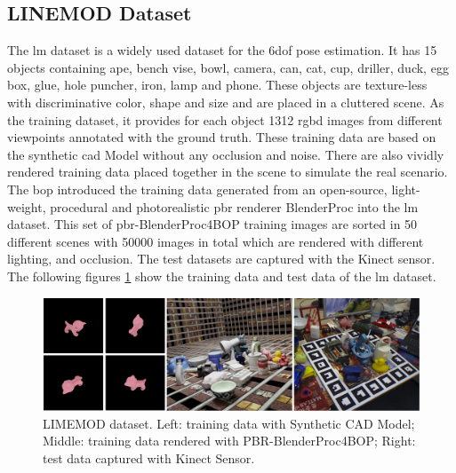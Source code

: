 \documentclass[12pt,DIV14,BCOR12mm,a4paper,footinclude=false,headinclude,parskip=half-,twoside,openright,cleardoublepage=empty,toc=index,bibliography=totoc,listof=totoc]{scrreprt}
\numberwithin{equation}{chapter}
\begin{document}
\subsection{LINEMOD Dataset}
The \gls{lm} dataset \cite{hinterstoisser2012model} is a widely used dataset for the \gls{6dof} pose estimation. It has 15 objects containing ape, bench vise, bowl, camera, can, cat, cup, driller, duck, egg box, glue, hole puncher, iron, lamp and phone. These objects are texture-less with discriminative color, shape and size and are placed in a cluttered scene. As the training dataset, it provides for each object 1312 \gls{rgbd} images from different viewpoints annotated with the ground truth. These training data are based on the synthetic \gls{cad} Model without any occlusion and noise. There are also vividly rendered training data placed together in the scene to simulate the real scenario. The \gls{bop} \cite{hodan2018bop} introduced the training data generated from an open-source, light-weight, procedural and photorealistic \gls{pbr} renderer BlenderProc \cite{denninger2019blenderproc} into the \gls{lm} dataset.
This set of \gls{pbr}-BlenderProc4BOP training images are sorted in 50 different scenes with 50000 images in total which are rendered with different lighting, and occlusion. The test datasets are captured with the Kinect sensor. The following figures \ref{img:linemod} show the training data and test data of the \gls{lm} dataset.
\begin{figure}[h]
  \centering
  \includegraphics[width=1.0\textwidth]{img/lm.pdf}
  \caption{LIMEMOD dataset. Left: training data with Synthetic CAD Model; Middle: training data rendered with PBR-BlenderProc4BOP; Right: test data captured with Kinect Sensor.}
  \label{img:linemod}
\end{figure}
\end{document}

